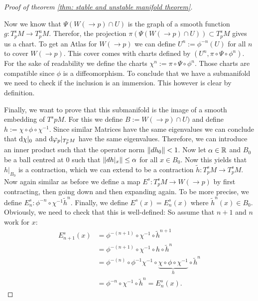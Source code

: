 \begin{proof}[Proof of theorem \ref{thm: stable and unstable manifold theorem}]
\begin{itemize}
	\end{itemize}
	Now we know that $\Psi(W(\to p)\cap U)$ is the graph of a smooth function $g:T^s_pM\to T^u_pM$. Therefor, the projection $\pi(\Psi(W(\to p)\cap U))\subset T^s_pM$ gives us a chart. To get an Atlas for $W(\to p)$ we can define $U^n:=\phi^{-n}(U)$ for all $n$ to cover $W(\to p)$. This cover comes with charts defined by $(U^n,\pi \circ \Psi \circ \phi^n)$. For the sake of readability we define the charts $\chi^n:=\pi \circ \Psi \circ \phi^n$. Those charts are compatible since $\phi$ is a diffeomorphism. To conclude that we have a submanifold we need to check if the inclusion is an immersion. This however is clear by definition. 
	
	Finally, we want to prove that this submanifold is the image of a smooth embedding of $T^spM$. For this we define $B:= W(\to p)\cap U)$ and define $h:= \chi\circ \phi \circ \chi^{-1}$. Since similar Matrices have the same eigenvalues we can conclude that $\mathop{}\!\mathrm{d}\chi|_0$ and $\mathop{}\!\mathrm{d} \varphi_p|_{T^s_pM}$ have the same eigenvalues.
	\color{red} Therefore, we can introduce an inner product such that the operator norm $\left\lVert dh_0\right\rVert<1$. \color{black} Now let $\alpha\in \mathbb{R}$ and $B_0$ be a ball centred at $0$ such that $\left\lVert dh|_x\right\rVert \leq \alpha$ for all $x\in B_0$. 
	Now this yields that $h|_{B_0}$ is a contraction, which we can extend to be a contraction $\tilde{h}:T^s_pM\to T^s_pM$. Now again similar as before we define a map $E^s:T^s_pM\to W(\to p)$ by first contracting, then going down and then expanding again. To be more precise, we define $E_n^s:\phi^{-n} \circ \chi^{-1} \tilde{h}^n$. 
	Finally, we define $E^s(x)=E^s_n(x)$ where $\tilde{h}^n(x)\in B_0$. Obviously, we need to check that this is well-defined: So assume that $n+1$ and $n$ work for $x$:
	\begin{align*}
		E^s_{n+1}(x)&=\phi^{-(n+1)}\circ \chi^{-1} \circ \tilde h^{n+1} \\
		&=\phi^{-(n+1)}\circ \chi^{-1} \circ h\circ \tilde{h}^{n} \\
		&=\phi^{-(n)}\circ \phi^{-1} \chi^{-1} \circ \underbrace{\chi \circ \phi \circ \chi^{-1}}_{h} \circ \tilde{h}^{n} \\
		&=\phi^{-n} \circ \chi^{-1} \circ \tilde{h}^{n}=E^s_n(x).

\end{align*}
\end{proof}
